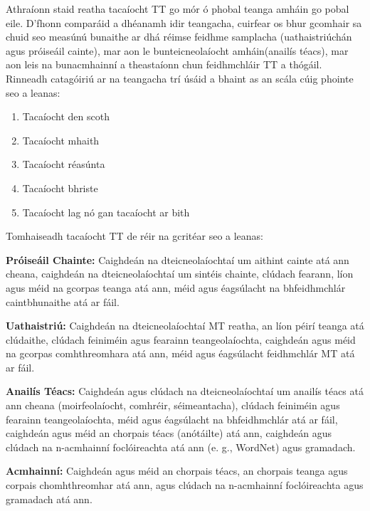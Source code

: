 \begin{multicols}{2}
Athraíonn staid reatha tacaíocht TT go mór ó phobal teanga amháin go pobal eile. D'fhonn comparáid a dhéanamh idir teangacha, cuirfear os bhur gcomhair sa chuid seo measúnú bunaithe ar dhá réimse feidhme samplacha (uathaistriúchán agus próiseáil cainte), mar aon le bunteicneolaíocht amháin(anailís téacs), mar aon leis na bunacmhainní a theastaíonn chun feidhmchláir TT a thógáil. Rinneadh catagóiriú ar na teangacha trí úsáid a bhaint as an scála cúig phointe seo a leanas:

\begin{enumerate} 
\item Tacaíocht den scoth
\item Tacaíocht mhaith
\item Tacaíocht réasúnta
\item Tacaíocht bhriste
\item Tacaíocht lag nó gan tacaíocht ar bith
\end{enumerate}

Tomhaiseadh tacaíocht TT de réir na gcritéar seo a leanas:

\textbf{Próiseáil Chainte:} Caighdeán na dteicneolaíochtaí um aithint cainte atá ann cheana, caighdeán na dteicneolaíochtaí um sintéis chainte, clúdach fearann, líon agus méid na gcorpas teanga atá ann, méid agus éagsúlacht na bhfeidhmchlár caintbhunaithe atá ar fáil.

\textbf{Uathaistriú:} Caighdeán na dteicneolaíochtaí MT reatha, an líon péirí teanga atá clúdaithe, clúdach feiniméin agus fearainn teangeolaíochta, caighdeán agus méid na gcorpas comhthreomhara atá ann, méid agus éagsúlacht feidhmchlár MT atá ar fáil.

\textbf{Anailís Téacs:} Caighdeán agus clúdach na dteicneolaíochtaí um anailís téacs atá ann cheana (moirfeolaíocht, comhréir, séimeantacha), clúdach feiniméin agus fearainn teangeolaíochta, méid agus éagsúlacht na bhfeidhmchlár atá ar fáil, caighdeán agus méid an chorpais téacs (anótáilte) atá ann, caighdeán agus clúdach na n-acmhainní foclóireachta atá ann (e. g., WordNet) agus gramadach.

\textbf{Acmhainní:} Caighdeán agus méid an chorpais téacs, an chorpais teanga agus corpais chomhthreomhar atá ann, agus clúdach na n-acmhainní foclóireachta agus gramadach atá ann.


\end{multicols}
